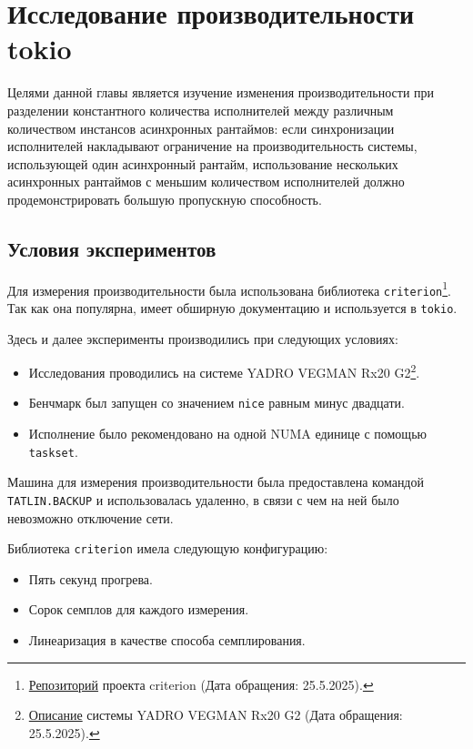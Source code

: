 
\section{Исследование производительности tokio}

Целями данной главы является изучение изменения производительности при разделении константного количества исполнителей между различным количеством инстансов асинхронных рантаймов: если синхронизации исполнителей накладывают ограничение на производительность системы, использующей один асинхронный рантайм, использование нескольких асинхронных рантаймов с меньшим количеством исполнителей должно продемонстрировать большую пропускную способность.

\subsection{Условия экспериментов}\label{experiment_environment}

Для измерения производительности была использована библиотека \verb|criterion|\footnote{\href{https://github.com/bheisler/criterion.rs}{Репозиторий} проекта criterion (Дата обращения: 25.5.2025).}. Так как она популярна, имеет обширную документацию и используется в \verb|tokio|.

Здесь и далее эксперименты производились при следующих условиях:

\begin{itemize}
    \item Исследования проводились на системе YADRO VEGMAN Rx20 G2\footnote{\href{https://yadro.com/ru/vegman/rx20g2/specs}{Описание} системы YADRO VEGMAN Rx20 G2 (Дата обращения: 25.5.2025).}.
    \item Бенчмарк был запущен со значением \verb|nice| равным минус двадцати.
    \item Исполнение было рекомендовано на одной NUMA единице с помощью \verb|taskset|.
\end{itemize}

Машина для измерения производительности была предоставлена командой \verb|TATLIN.BACKUP| и использовалась удаленно, в связи с чем на ней было невозможно отключение сети.

Библиотека \verb|criterion| имела следующую конфигурацию:

\begin{itemize}
    \item Пять секунд прогрева.
    \item Сорок семплов для каждого измерения.
    \item Линеаризация в качестве способа семплирования.
\end{itemize}


